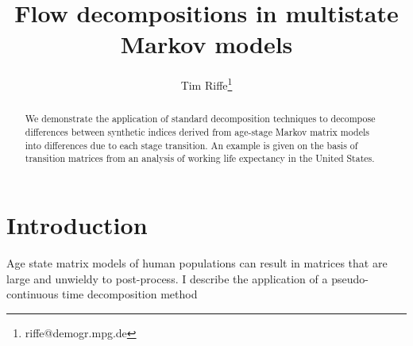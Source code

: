 \documentclass{article}
\begin{document}
\title{Flow decompositions in multistate Markov models}
\author[1]{Tim Riffe\thanks{riffe@demogr.mpg.de}}
\maketitle

\begin{abstract}
We demonstrate the application of standard decomposition techniques to decompose
differences between synthetic indices derived from age-stage Markov matrix
models into differences due to each stage transition. An example is given on the basis
of transition matrices from an analysis of working life expectancy in the
United States.
\end{abstract}

\section{Introduction}
Age state matrix models of human populations can result in matrices that are
large and unwieldy to post-process. I describe the application of a
pseudo-continuous time decomposition method \citep{horiuchi2008} 

\singlespacing

   
\end{document}

